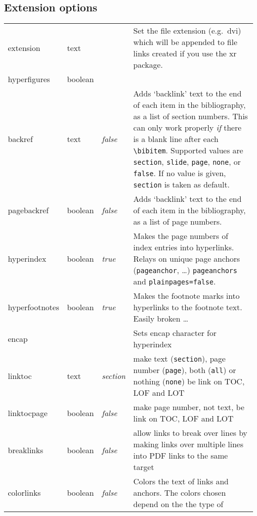 \documentclass{article}
\newcommand*{\xpackage}[1]{\textsf{#1}}
\begin{document}
\subsection{Extension options}
\begin{longtable}{@{}>{\ttfamily}ll>{\itshape}lp{8cm}@{}}
extension      & text    &         & Set the file extension (e.g.\ \textsf{dvi}) which will be appended to file links
                                     created if you use the \xpackage{xr} package. \\
hyperfigures   & boolean &         & \\
backref        & text    & false   & Adds `backlink' text to the end of each item in the bibliography, as a list of
                                     section numbers. This can only work properly \emph{if} there is a blank line after
                                     each \verb|\bibitem|. Supported values are \verb|section|, \verb|slide|, \verb|page|,
                                     \verb|none|, or \verb|false|. If no value is given, \verb|section| is taken as default.\\
pagebackref    & boolean & false   & Adds `backlink' text to the end of each item in the bibliography, as a list of page
                                     numbers. \\
hyperindex     & boolean & true    & Makes the page numbers of index entries into hyperlinks. Relays on unique
                                     page anchors (\verb|pageanchor|, \ldots)
                                     \verb|pageanchors| and \verb|plainpages=false|. \\
hyperfootnotes & boolean & true    & Makes the footnote marks into hyperlinks to the footnote text.
                                     Easily broken \ldots\\
encap          &         &         & Sets encap character for hyperindex \\
linktoc        & text    & section & make text (\verb|section|), page number (\verb|page|), both (\verb|all|) or nothing (\verb|none|) be link on TOC, LOF and LOT \\
linktocpage    & boolean & false   & make page number, not text, be link on TOC, LOF and LOT \\
breaklinks     & boolean & false   & allow links to break over lines by making links over multiple lines into PDF links to
                                     the same target \\
colorlinks     & boolean & false   & Colors the text of links and anchors. The colors chosen depend on the the type of

\end{longtable}
\end{document}
